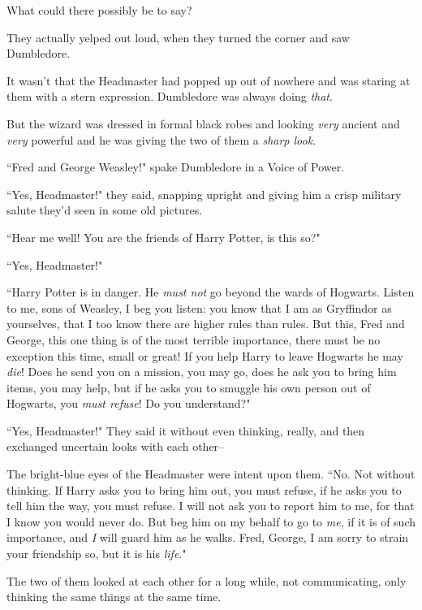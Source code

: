 What could there possibly be to say?


They actually yelped out loud, when they turned the corner and saw Dumbledore.

It wasn't that the Headmaster had popped up out of nowhere and was staring at them with a stern expression. Dumbledore was always doing \emph{that}.

But the wizard was dressed in formal black robes and looking \emph{very} ancient and \emph{very} powerful and he was giving the two of them a \emph{sharp look}.

``Fred and George Weasley!" spake Dumbledore in a Voice of Power.

``Yes, Headmaster!" they said, snapping upright and giving him a crisp military salute they'd seen in some old pictures.

``Hear me well! You are the friends of Harry Potter, is this so?"

``Yes, Headmaster!"

``Harry Potter is in danger. He \emph{must not} go beyond the wards of Hogwarts. Listen to me, sons of Weasley, I beg you listen: you know that I am as Gryffindor as yourselves, that I too know there are higher rules than rules. But this, Fred and George, this one thing is of the most terrible importance, there must be no exception this time, small or great! If you help Harry to leave Hogwarts he may \emph{die}! Does he send you on a mission, you may go, does he ask you to bring him items, you may help, but if he asks you to smuggle his own person out of Hogwarts, you \emph{must refuse}! Do you understand?"

``Yes, Headmaster!" They said it without even thinking, really, and then exchanged uncertain looks with each other\---

The bright-blue eyes of the Headmaster were intent upon them. ``No. Not without thinking. If Harry asks you to bring him out, you must refuse, if he asks you to tell him the way, you must refuse. I will not ask you to report him to me, for that I know you would never do. But beg him on my behalf to go to \emph{me}, if it is of such importance, and \emph{I} will guard him as he walks. Fred, George, I am sorry to strain your friendship so, but it is his \emph{life}."

The two of them looked at each other for a long while, not communicating, only thinking the same things at the same time.

